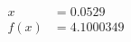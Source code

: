 \documentclass[preview]{standalone}
\begin{document}
\begin{align*}
x &= 0.0529\\f(x) &= 4.1000349
\end{align*}
\end{document}
